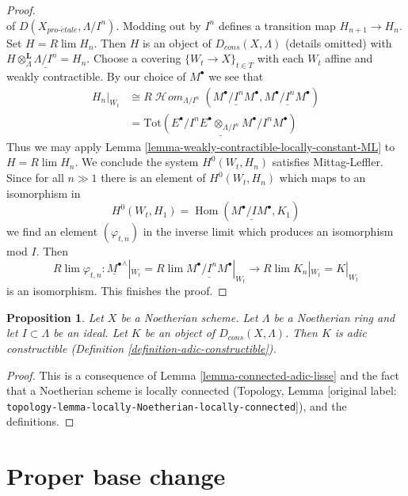\documentclass[10pt,a4paper]{article}
\theoremstyle{plain}
\newtheorem{proposition}[subsection]{Proposition}
\theoremstyle{definition}
\theoremstyle{remark}
\numberwithin{equation}{subsection}
\def\lim{\mathop{\mathrm{lim}}\nolimits}
\def\Hom{\mathop{\mathrm{Hom}}\nolimits}
\def\SheafHom{\mathop{\mathcal{H}\!\mathit{om}}\nolimits}
\def\proetale{{pro\text{-}\acute{e}tale}}
\begin{document}
\begin{proof}
$$$$
of $D(X_\proetale, \Lambda/I^n)$. Modding out by $I^n$ defines a
transition map $H_{n + 1} \to H_n$. Set $H = R\lim H_n$. Then $H$ is an
object of $D_{cons}(X, \Lambda)$ (details omitted) with
$H \otimes_\Lambda^\mathbf{L} \underline{\Lambda/I^n} = H_n$.
Choose a covering $\{W_t \to X\}_{t \in T}$ with each $W_t$
affine and weakly contractible. By our choice of $M^\bullet$
we see that
\begin{align*}
H_n|_{W_t} & \cong 
R\SheafHom_{\Lambda/I^n}(\underline{M^\bullet/I^nM^\bullet},
\underline{M^\bullet/I^nM^\bullet}) \\
& =
\underline{
\text{Tot}(E^\bullet/I^nE^\bullet \otimes_{\Lambda/I^n} M^\bullet/I^nM^\bullet)
}
\end{align*}
Thus we may apply Lemma \ref{lemma-weakly-contractible-locally-constant-ML}
to $H = R\lim H_n$. We conclude the system $H^0(W_t, H_n)$ satisfies
Mittag-Leffler. Since for all $n \gg 1$ there is an element of $H^0(W_t, H_n)$
which maps to an isomorphism in
$$
H^0(W_t, H_1) = \Hom(\underline{M^\bullet/IM^\bullet}, K_1)
$$
we find an element $(\varphi_{t, n})$
in the inverse limit which produces an isomorphism mod $I$. Then
$$
R\lim \varphi_{t, n} :
\underline{M^\bullet}^\wedge|_{W_t} =
R\lim \underline{M^\bullet/I^nM^\bullet}|_{W_t}
\longrightarrow
R\lim K_n|_{W_t} = K|_{W_t}
$$
is an isomorphism. This finishes the proof.
\end{proof}

\begin{proposition}
\label{proposition-Noetherian-adic-constructible}
Let $X$ be a Noetherian scheme. Let $\Lambda$ be a Noetherian ring and
let $I \subset \Lambda$ be an ideal. Let $K$ be an object of
$D_{cons}(X, \Lambda)$. Then $K$ is adic constructible
(Definition \ref{definition-adic-constructible}).
\end{proposition}

\begin{proof}
This is a consequence of Lemma \ref{lemma-connected-adic-lisse}
and the fact that a Noetherian scheme is locally connected
(Topology, Lemma \textnormal{[original label: \nolinkurl{topology-lemma-locally-Noetherian-locally-connected}]}),
and the definitions.
\end{proof}







\section{Proper base change}
\label{section-proper-base-change}
\end{document}
